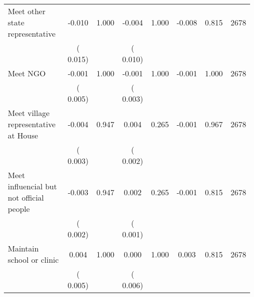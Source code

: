 \begin{tabular}{l*{7}{c}}
 Meet other state representative       &             -0.010       &        1.000  &             -0.004       &        1.000  &             -0.008       &              0.815 &  2678 \\ 
                       &       (       0.015)             &                               &       (       0.010)                     &                               &                                               &                                &                      \\ 

 Meet NGO       &             -0.001       &        1.000  &             -0.001       &        1.000  &             -0.001       &              1.000 &  2678 \\ 
                       &       (       0.005)             &                               &       (       0.003)                     &                               &                                               &                                &                      \\ 

 Meet village representative at House       &             -0.004       &        0.947  &              0.004       &        0.265  &             -0.001       &              0.967 &  2678 \\ 
                       &       (       0.003)             &                               &       (       0.002)                     &                               &                                               &                                &                      \\ 

 Meet influencial but not official people       &             -0.003       &        0.947  &              0.002       &        0.265  &             -0.001       &              0.815 &  2678 \\ 
                       &       (       0.002)             &                               &       (       0.001)                     &                               &                                               &                                &                      \\ 

 Maintain school or clinic       &              0.004       &        1.000  &              0.000       &        1.000  &              0.003       &              0.815 &  2678 \\ 
                       &       (       0.005)             &                               &       (       0.006)                     &                               &                                               &                                &                      \\ 


\end{tabular}

